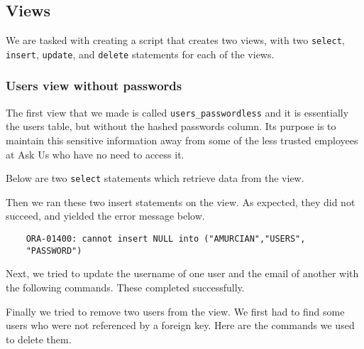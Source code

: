 \subsection{Views}

We are tasked with creating a script that creates two views, with two \verb`select`, \verb`insert`, \verb`update`, and \verb`delete` statements for each of the views.

\subsubsection{Users view without passwords}

The first view that we made is called \verb`users_passwordless` and it is essentially the users table, but without the hashed passwords column. Its purpose is to maintain this sensitive information away from some of the less trusted employees at Ask Us who have no need to access it.


Below are two \verb`select` statements which retrieve data from the view.


Then we ran these two insert statements on the view. As expected, they did not succeed, and yielded the error message below.


\begin{verbatim}
	ORA-01400: cannot insert NULL into ("AMURCIAN","USERS",
	"PASSWORD")
\end{verbatim}

Next, we tried to update the username of one user and the email of another with the following commands. These completed successfully.


Finally we tried to remove two users from the view. We first had to find some users who were not referenced by a foreign key. Here are the commands we used to delete them.


